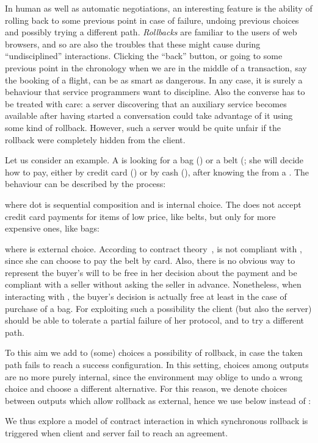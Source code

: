 \documentclass[UKenglish]{eptcs}
\begin{document}
In human as well as  automatic negotiations, an interesting feature is the ability of rolling back to some previous point in case of failure, undoing previous choices and  possibly trying a different path. {\em Rollbacks} are familiar to the users of web browsers, and so are also the troubles that these might cause during ``undisciplined'' interactions. Clicking the ``back'' button, or going to some previous point in the chronology when we are in the middle of a transaction, say the booking of a flight, can be as smart as dangerous. In any case, it is surely a behaviour that service programmers want to discipline. Also the converse has to be treated with care: a server discovering that an auxiliary service becomes available after having started a conversation could take advantage of it using some kind of rollback. However, such a server would be quite unfair if the rollback were completely hidden from the client. 

Let us consider an example.
A  is looking for a bag () or a belt (; she will decide how to pay, either by credit card () or by cash (), after knowing the  from a . The  behaviour can be described by the process:

where dot is sequential composition and  is internal choice. 
The  does not accept credit card payments for items of low price, like belts, but only for more expensive ones, like bags:

where  is external choice.
According to contract theory~\cite{CGP10},  is not compliant with , since she can choose to pay the belt by card. Also, there is no obvious way to represent the buyer's will to be free in her decision about the payment and be compliant with a seller without asking the seller in advance. Nonetheless, when interacting with , the buyer's decision is actually free at least in the case of purchase of a bag. For exploiting such a possibility the client (but also the server) should be able to tolerate a partial failure of her protocol, and to try a different path. 

To this aim we add to (some) choices a possibility of rollback, in
case the taken path fails to reach a success configuration. In
this setting, choices among outputs are no more purely internal, since
the environment may oblige to undo a wrong choice and choose a
different alternative. For this reason, we denote choices between outputs which allow rollback as external, hence we use  below instead of :

We thus explore a model of contract interaction in which synchronous
rollback is triggered when client and server fail to reach an agreement.
\end{document}

